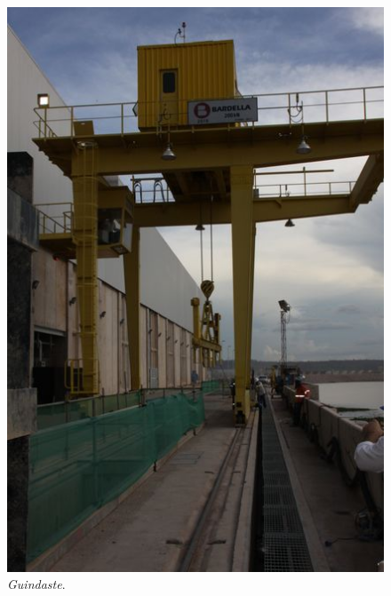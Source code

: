 \begin{figure}[H]
    \centering
    \includegraphics[width=0.9\columnwidth]{figs/nomenclatura/3.jpg}
    \caption{\emph{Guindaste}.}
    \label{nomenclatura_3}
\end{figure}
